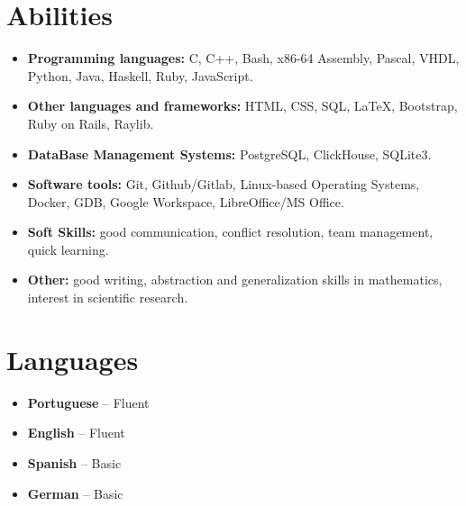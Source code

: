 \documentclass[a4paper, 12pt]{moderncv}
\begin{document}
\section{Abilities}
\vspace{4pt}
\begin{itemize}
    \item{\textbf{Programming languages:} C, C++, Bash, x86-64 Assembly, Pascal, VHDL,
        Python, Java, Haskell, Ruby, JavaScript.}
    \item{\textbf{Other languages and frameworks:} HTML, CSS, SQL, \LaTeX, Bootstrap,
        Ruby on Rails, Raylib.}
    \vspace{4pt}
    \item{\textbf{DataBase Management Systems:} PostgreSQL, ClickHouse, SQLite3.}
    \vspace{4pt}
    \item{\textbf{Software tools:} Git, Github/Gitlab, Linux-based Operating
        Systems, Docker, GDB, Google Workspace, LibreOffice/MS Office.}
    \vspace{4pt}
    \item{\textbf{Soft Skills:} good communication, conflict resolution, team management,
        quick learning.}
    \vspace{4pt}
    \item{\textbf{Other:} good writing, abstraction and generalization skills in
        mathematics, interest in scientific research.}
\end{itemize}
\vspace{4pt}

\section{Languages}
\vspace{4pt}
\begin{itemize}
    \item{\textbf{Portuguese} -- Fluent}
    \item{\textbf{English} -- Fluent}
    \item{\textbf{Spanish} -- Basic}
    \item{\textbf{German} -- Basic}
\end{itemize}
\vspace{4pt}
\end{document}
